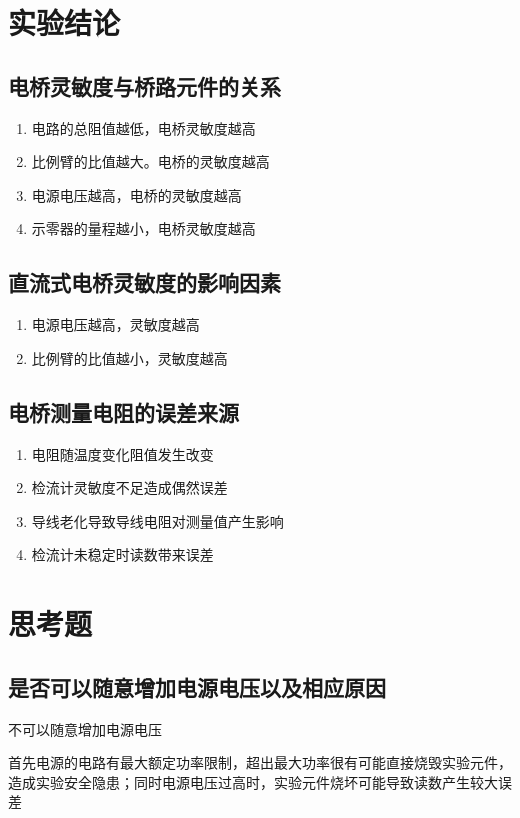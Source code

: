 \documentclass[UTF8]{ctexart}
\begin{document}
\section{实验结论}

\subsection{电桥灵敏度与桥路元件的关系}
\begin{enumerate}
    \item 电路的总阻值越低，电桥灵敏度越高
    \item 比例臂的比值越大。电桥的灵敏度越高
    \item 电源电压越高，电桥的灵敏度越高
    \item 示零器的量程越小，电桥灵敏度越高
\end{enumerate}


\subsection{直流式电桥灵敏度的影响因素}
\begin{enumerate}
    \item 电源电压越高，灵敏度越高
    \item 比例臂的比值越小，灵敏度越高
\end{enumerate}

\subsection{电桥测量电阻的误差来源}
\begin{enumerate}
    \item 电阻随温度变化阻值发生改变
    \item 检流计灵敏度不足造成偶然误差
    \item 导线老化导致导线电阻对测量值产生影响
    \item 检流计未稳定时读数带来误差
\end{enumerate}
\section{思考题}
\subsection{是否可以随意增加电源电压以及相应原因}
不可以随意增加电源电压

首先电源的电路有最大额定功率限制，超出最大功率很有可能直接烧毁实验元件，造成实验安全隐患；同时电源电压过高时，实验元件烧坏可能导致读数产生较大误差
\end{document}
